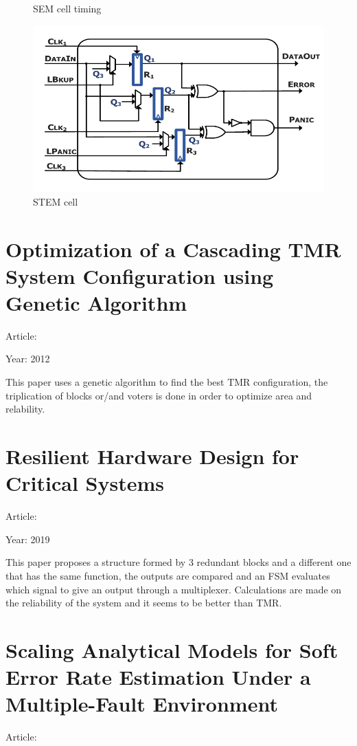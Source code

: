 {{\begin{figure}[H]
			\caption{SEM cell timing}
			\label{fig:SEMCELLTIMING}
		\end{figure}
		\begin{figure}[H]
			\centering
			\includegraphics[scale=0.4]{./images/Articles_image/Low_Overhead_Soft_Error_Mitigation_Techniques_for_High-Performance_and_Aggressive_Designs_STEM.png}  
			\caption{STEM cell}
			\label{fig:STEMCELL}
		\end{figure}
	}
	\section{Optimization of a Cascading TMR System Configuration using Genetic Algorithm}{
		Article: \cite{Optimization_of_a_Cascading_TMR_system_configuration_using_Genetic_Algorithm}
		
		Year: 2012
		
		This paper uses a genetic algorithm to find the best TMR configuration, the triplication of blocks or/and voters is done in order to optimize area and relability. 
	}
	\section{Resilient Hardware Design for Critical Systems}{
		Article: \cite{Resilient_Hardware_Design_for_Critical_Systems}
		
		Year: 2019
		
		This paper proposes a structure formed by 3 redundant blocks and a different one that has the same function, the outputs are compared and an FSM evaluates which signal to give an output through a multiplexer. Calculations are made on the reliability of the system and it seems to be better than TMR.
	}
	\section{Scaling Analytical Models for Soft Error Rate Estimation Under a Multiple-Fault Environment}{
		Article: \cite{Scaling_Analytical_Models_for_Soft_Error_Rate_Estimation_Under_a_Multiple-Fault_Environment}
		
}}
